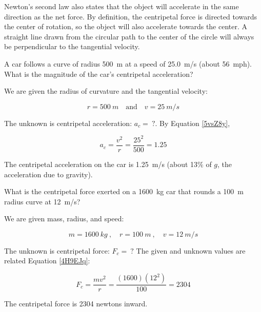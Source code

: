 \documentclass[main-physics.tex]{subfiles}
\begin{document}
Newton's second law also states that the object will accelerate in the same direction as the net force. By definition, the centripetal force is directed towards the center of rotation, so the object will also accelerate towards the center. A straight line drawn from the circular path to the center of the circle will always be perpendicular to the tangential velocity. 

\begin{example}
    A car follows a curve of radius \SI{500}{m} at a speed of \SI{25.0}{m/s} (about \SI{56}{mph}). What is the magnitude of the car's centripetal acceleration?
\end{example}

\Solution We are given the radius of curvature and the tangential velocity:

\begin{equation*}
    r = \SI{500}{m} \quad \text{and} \quad v = \SI{25}{m/s}
\end{equation*}

The unknown is centripetal acceleration: $a_c =\ ?$. By Equation \eqref{5vsZ8y},

\begin{equation*}
    a_c = \frac{v^2}{r} = \frac{25^2}{500} = 1.25 
\end{equation*}

The centripetal acceleration on the car is \SI{1.25}{m/s} (about 13\% of $g$, the acceleration due to gravity).

\endsolution

\begin{example}
    What is the centripetal force exerted on a \SI{1600}{kg} car that rounds a \SI{100}{m} radius curve at \SI{12}{m/s}?
\end{example}

\Solution We are given mass, radius, and speed:

\begin{equation*}
    m = \SI{1600}{kg}\ , \quad 
    r = \SI{100}{m}\ , \quad
    v = \SI{12}{m/s}
\end{equation*}

The unknown is centripetal force: $F_c =\ ?$ The given and unknown values are related Equation \eqref{4H9EJq}:

\begin{equation*}
    F_c = \frac{m v^2}{r} = \frac{(1600)(12^2)}{100} = 2304
\end{equation*}

The centripetal force is 2304 newtons inward. 
\end{document}
